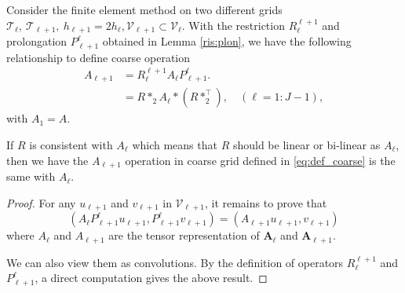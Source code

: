 Consider the finite element method on two different grids 
$\mathcal T_\ell,~\mathcal T_{\ell+1},~h_{\ell+1}=2h_\ell, \mathcal V_{\ell+1}\subset \mathcal V_{\ell}$. 
With the restriction $R_{\ell}^{\ell+1}$ and prolongation $P_{\ell+1}^\ell$ obtained in Lemma \ref{ris:plon}, we have the following relationship to define coarse operation
\begin{equation}\label{eq:def_coarse}
\begin{aligned}
 A_{\ell+1}&=R_{\ell}^{\ell+1}  A_{\ell}P_{\ell+1}^{\ell}.  \\
&= R \ast_2 A_\ell \ast (R\ast_2^\top),   \quad (\ell = 1:J-1),
\end{aligned}
\end{equation}
with $A_1 = A$. 
\begin{theorem}
If $R$ is consistent with $A_\ell$ which means that $R$ should be linear or bi-linear as $A_\ell$, then we have
the $A_{\ell+1}$ operation in coarse grid defined in \eqref{eq:def_coarse} is the same with $A_\ell$.
\end{theorem}
\begin{proof}
For any $u_{\ell+1}$ and $v_{\ell+1}$ in $\mathcal V_{\ell+1}$, it remains to prove that
$$
(A_\ell P_{\ell+1}^\ell u_{\ell+1},P_{\ell+1}^\ell v_{\ell+1}) = (A_{\ell+1}u_{\ell+1}, v_{\ell+1})
$$
where $A_\ell$ and $A_{\ell+1}$ are the tensor representation of $\mathbf A_\ell$ and $\mathbf A_{\ell+1}$.

We can also view them as convolutions. By the definition of operators $R_{\ell}^{\ell+1}$ and $P_{\ell+1}^\ell$, a direct computation gives the above result.
\end{proof}
